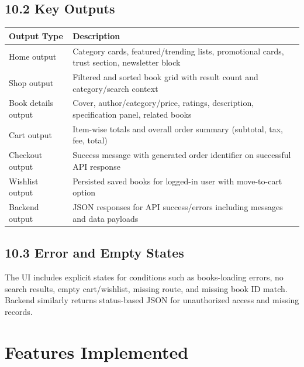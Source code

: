 \documentclass[12pt,a4paper]{report}
\begin{document}
\section*{10.2 Key Outputs}
\begin{longtable}{>{\raggedright\arraybackslash}p{} >{\raggedright\arraybackslash}p{}}
\toprule
\textbf{Output Type} & \textbf{Description} \\
\midrule
Home output & Category cards, featured/trending lists, promotional cards, trust section, newsletter block \\
Shop output & Filtered and sorted book grid with result count and category/search context \\
Book details output & Cover, author/category/price, ratings, description, specification panel, related books \\
Cart output & Item-wise totals and overall order summary (subtotal, tax, fee, total) \\
Checkout output & Success message with generated order identifier on successful API response \\
Wishlist output & Persisted saved books for logged-in user with move-to-cart option \\
Backend output & JSON responses for API success/errors including messages and data payloads \\
\bottomrule
\end{longtable}

\section*{10.3 Error and Empty States}
The UI includes explicit states for conditions such as books-loading errors, no search results, empty cart/wishlist, missing route, and missing book ID match. Backend similarly returns status-based JSON for unauthorized access and missing records.

\chapter{Features Implemented}
\end{document}
